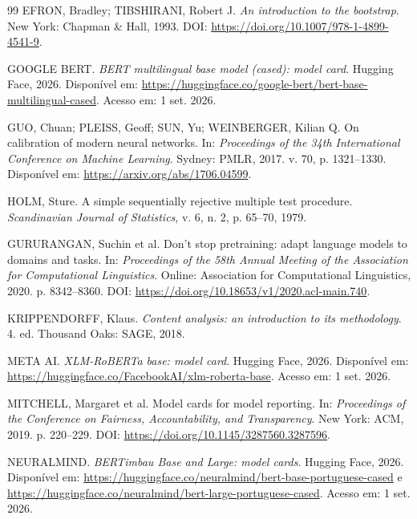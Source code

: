 \begin{thebibliography}{99}
EFRON, Bradley; TIBSHIRANI, Robert J.
\textit{An introduction to the bootstrap}.
New York: Chapman \& Hall, 1993.
DOI: \url{https://doi.org/10.1007/978-1-4899-4541-9}.

GOOGLE BERT.
\textit{BERT multilingual base model (cased): model card}.
Hugging Face, 2026.
Disponível em:
\url{https://huggingface.co/google-bert/bert-base-multilingual-cased}.
Acesso em: 1 set. 2026.

GUO, Chuan; PLEISS, Geoff; SUN, Yu; WEINBERGER, Kilian Q.
On calibration of modern neural networks.
In: \textit{Proceedings of the 34th International Conference on Machine Learning}.
Sydney: PMLR, 2017. v. 70, p. 1321--1330.
Disponível em: \url{https://arxiv.org/abs/1706.04599}.

HOLM, Sture.
A simple sequentially rejective multiple test procedure.
\textit{Scandinavian Journal of Statistics}, v. 6, n. 2, p. 65--70, 1979.

GURURANGAN, Suchin et al.
Don't stop pretraining: adapt language models to domains and tasks.
In: \textit{Proceedings of the 58th Annual Meeting of the Association for
Computational Linguistics}. Online: Association for Computational Linguistics,
2020. p. 8342--8360.
DOI: \url{https://doi.org/10.18653/v1/2020.acl-main.740}.

KRIPPENDORFF, Klaus.
\textit{Content analysis: an introduction to its methodology}.
4. ed. Thousand Oaks: SAGE, 2018.

META AI.
\textit{XLM-RoBERTa base: model card}.
Hugging Face, 2026.
Disponível em: \url{https://huggingface.co/FacebookAI/xlm-roberta-base}.
Acesso em: 1 set. 2026.

MITCHELL, Margaret et al.
Model cards for model reporting.
In: \textit{Proceedings of the Conference on Fairness, Accountability, and
Transparency}. New York: ACM, 2019. p. 220--229.
DOI: \url{https://doi.org/10.1145/3287560.3287596}.

NEURALMIND.
\textit{BERTimbau Base and Large: model cards}.
Hugging Face, 2026.
Disponível em:
\url{https://huggingface.co/neuralmind/bert-base-portuguese-cased} e
\url{https://huggingface.co/neuralmind/bert-large-portuguese-cased}.
Acesso em: 1 set. 2026.


\end{thebibliography}
